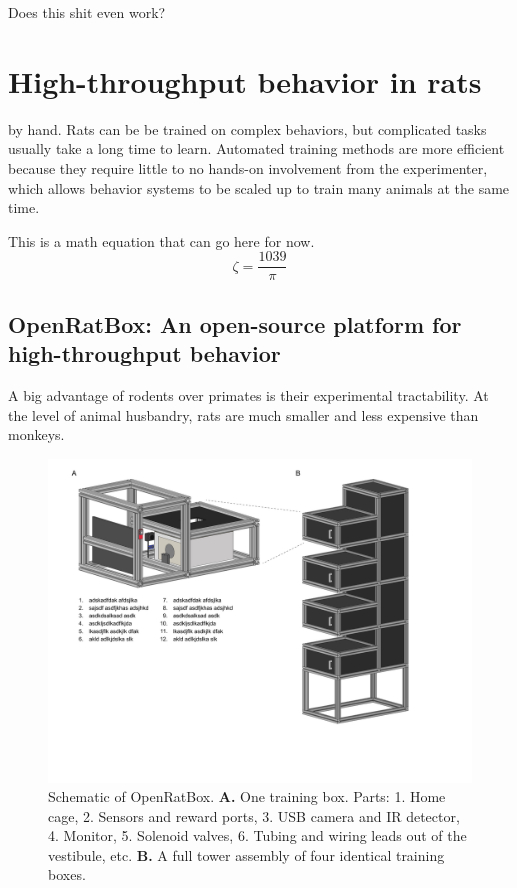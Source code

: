 \begin{savequote}[75mm]
Does this shit even work?
\end{savequote}

\chapter{High-throughput behavior in rats}

 by hand. Rats can be be trained on complex behaviors, but complicated tasks usually take a long time to learn. Automated training methods are more efficient because they require little to no hands-on involvement from the experimenter, which allows behavior systems to be scaled up to train many animals at the same time.     

This is a math equation that can go here for now.
$$\zeta = \frac{1039}{\pi}$$

\section{OpenRatBox: An open-source platform for high-throughput behavior}
A big advantage of rodents over primates is their experimental tractability. At the level of animal husbandry, rats are much smaller and less expensive than monkeys. 

\begin{figure}[t!]
    \includegraphics[width=\textwidth]{figures/chapter_1/ratbox_schematic.pdf}
    \vspace{.1in}
    \caption[OpenRatBox]{Schematic of OpenRatBox. \textbf{A.} One training box. Parts: 1. Home cage, 2. Sensors and reward ports, 3. USB camera and IR detector, 4. Monitor, 5. Solenoid valves, 6. Tubing and wiring leads out of the vestibule, etc. \textbf{B.} A full tower assembly of four identical training boxes. 
    \label{fig:ratbox_schematic}}
\end{figure}


